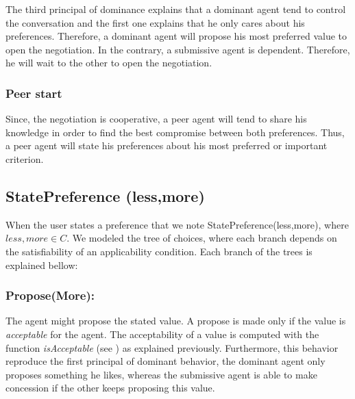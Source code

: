 \documentclass{llncs}
\begin{document}
The third principal of dominance explains that a dominant agent tend to control the conversation and the first one explains that he only cares about his preferences. Therefore, a dominant agent will propose his most preferred value to open the negotiation. In the contrary, a submissive agent is dependent. Therefore, he will wait to the other to open the negotiation.

\subsubsection{Peer start} Since, the negotiation is cooperative, a peer agent will tend to share his knowledge in order to find 
the best compromise between both preferences. Thus, a peer agent will state his preferences about his most preferred or important criterion.
\subsection{StatePreference (less,more)}
When the user states a preference that we note StatePreference(less,more), where $less, more \in C$.  We modeled the tree of choices, where each branch depends on the satisfiability of an applicability condition. Each branch of the trees is explained bellow:
 		\subsubsection{Propose(More):} The agent might propose the stated value. A propose is made only if the value is \emph{acceptable} for the agent. The acceptability of a value is computed with the function \emph{isAcceptable} (see ) as explained previously. Furthermore, this behavior reproduce the first principal of dominant behavior, the dominant agent only proposes something he likes, whereas the submissive agent is able to make concession if the other keeps proposing this value. 
 		
\end{document}
